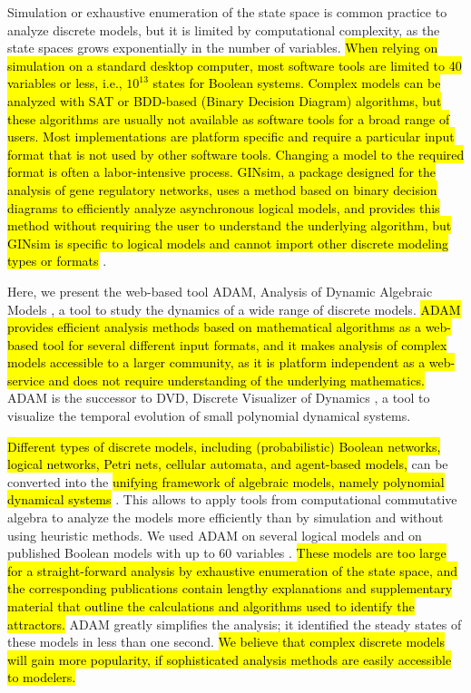 \documentclass[10pt]{bmc_article}
\newenvironment{bmcformat}{\begin{raggedright}\baselineskip20pt\sloppy\setboolean{publ}{false}}{\end{raggedright}\baselineskip20pt\sloppy}
\newcommand{\comment}[1]{}
\begin{document}
\begin{bmcformat}
Simulation or exhaustive enumeration of the state space is common practice to analyze discrete models, but it is limited by computational complexity, as the state spaces grows exponentially in the number of variables. \hl{When relying on simulation on a standard desktop computer, most software tools are limited to 40 variables or less, i.e., $10^{13}$ states for Boolean systems. Complex models can be analyzed with SAT or BDD-based (Binary Decision Diagram) algorithms, but these algorithms are usually not available as software tools for a broad range of users. Most implementations are platform specific and require a particular input format that is not used by other software tools. Changing a model to the required format is often a labor-intensive process. GINsim, a package designed for the analysis of gene regulatory networks, uses a method based on binary decision diagrams to efficiently analyze asynchronous logical models, and provides this method without requiring the user to understand the underlying algorithm, but GINsim is specific to logical models and cannot import other discrete modeling types or formats} \cite{GINsim}.
 
 \comment{In summary, only GINsim can non-heuristically analyze models with more than 32 variables for steady states and limit cycles when no initial state is given; and GINsim can analyze large models only when updates are assumed to be asynchronous}

Here, we present the web-based tool ADAM, Analysis of Dynamic
Algebraic Models \cite{ADAM}, a tool to study the dynamics of a wide
range of discrete models. \hl{ADAM provides efficient analysis methods based on mathematical algorithms as a web-based tool for several different input formats, and it makes analysis of complex models accessible to a larger community, as it is platform independent as a web-service and does not require understanding of the underlying mathematics.} ADAM is the successor to DVD, Discrete Visualizer of
Dynamics \cite{DVD}, a tool to visualize the temporal evolution of small
polynomial dynamical systems. 

\hl{Different types of discrete models, including  (probabilistic) Boolean networks, logical
networks, Petri nets, cellular automata, and agent-based 
models,} can be converted into the \hl{unifying framework of algebraic models, namely polynomial
dynamical systems} \cite{Alan:Bioinf2010, Hinkelmann:2010}. This allows to
apply tools from computational commutative algebra to analyze the models
more efficiently than by simulation and without using heuristic methods.
We used ADAM on several logical models and on published Boolean models with up to 60 variables \cite{GINsimRepo,AO,Pedicini-Tcell}. 
\hl{These models are too large for a straight-forward analysis by exhaustive
enumeration of the state space, and the corresponding publications contain lengthy explanations and supplementary material that outline the calculations and algorithms used to identify the attractors.} ADAM greatly simplifies the analysis; it
identified the steady states of these models in less than one second. \hl{We believe that complex discrete models will gain more popularity, if sophisticated analysis methods are easily accessible to modelers. }



\end{bmcformat}
\end{document}
